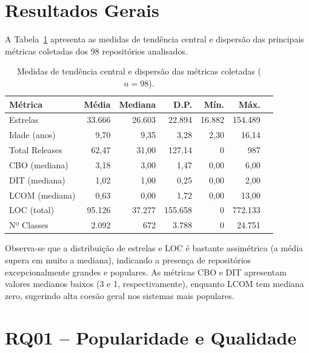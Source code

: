 \documentclass[12pt,a4paper]{article}
\begin{document}
\section{Resultados Gerais}

A Tabela~\ref{tab:central} apresenta as medidas de tendência central e dispersão
das principais métricas coletadas dos 98 repositórios analisados.

\begin{table}[htbp]
\centering
\caption{Medidas de tendência central e dispersão das métricas coletadas ($n = 98$).}
\label{tab:central}
\small
\begin{tabular}{lrrrrrr}
\toprule
\textbf{Métrica} & \textbf{Média} & \textbf{Mediana} & \textbf{D.P.} & \textbf{Mín.} & \textbf{Máx.} \\
\midrule
Estrelas           & 33.666  & 26.603  & 22.894    & 16.882  & 154.489   \\
Idade (anos)       & 9,70    & 9,35    & 3,28      & 2,30    & 16,14     \\
Total Releases     & 62,47   & 31,00   & 127,14    & 0       & 987       \\
CBO (mediana)      & 3,18    & 3,00    & 1,47      & 0,00    & 6,00      \\
DIT (mediana)      & 1,02    & 1,00    & 0,25      & 0,00    & 2,00      \\
LCOM (mediana)     & 0,63    & 0,00    & 1,72      & 0,00    & 13,00     \\
LOC (total)        & 95.126  & 37.277  & 155.658   & 0       & 772.133   \\
Nº Classes         & 2.092   & 672     & 3.788     & 0       & 24.751    \\
\bottomrule
\end{tabular}
\end{table}

Observa-se que a distribuição de estrelas e LOC é bastante assimétrica
(a média supera em muito a mediana), indicando a presença de repositórios
excepcionalmente grandes e populares. As métricas CBO e DIT apresentam valores
medianos baixos (3 e 1, respectivamente), enquanto LCOM tem mediana zero,
sugerindo alta coesão geral nos sistemas mais populares.

\section{RQ01 -- Popularidade e Qualidade}
\end{document}

